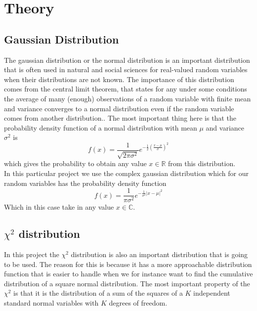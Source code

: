 \section{Theory}\label{sec:theory}
\subsection{Gaussian Distribution}
The gaussian distribution or the normal distribution is an important distribution that is often used in natural and social sciences for real-valued random variables when their distributions are not known. The importance of this distribution comes from the central limit theorem, that states for any under some conditions the average of many (enough) observations of a random variable with finite mean and variance converges to a normal distribution even if the random variable comes from another distribution.\cite{WikipediaGaussian}. The most important thing here is that the probability density function of a normal distribution with mean $\mu$ and variance $\sigma^2$ is
\begin{equation}
	f(x) = \frac{1}{\sqrt{2\pi\sigma^2}}e^{-\frac{1}{2}(\frac{x-\mu}{\sigma})^2}
\end{equation}
which gives the probability to obtain any value $x\in\mathbb{R}$ from this distribution.\\
In this particular project we use the complex gaussian distribution which for our random variables has the probability density function
\begin{equation}
	f(x) = \frac{1}{\pi\sigma^2}e^{-\frac{1}{\sigma^2}|x-\mu|^2}
\end{equation}
Which in this case take in any value $x\in\mathbb{C}$.
\subsection{$\chi^2$ distribution}
In this project the $\chi^2$ distribution is also an important distribution that is going to be used. The reason for this is because it has a more approachable distribution function that is easier to handle when we for instance want to find the cumulative distribution of a square normal distribution. The most important property of the $\chi^2$ is that it is the distribution of a sum of the squares of a $K$ independent standard normal variables with $K$ degrees of freedom.
